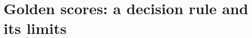 \documentclass[11pt]{article}
\numberwithin{equation}{section}
\theoremstyle{plain}
\theoremstyle{definition}
\theoremstyle{remark}
\begin{document}
%

\section{Golden scores: a decision rule and its limits}\label{gs:sec}
\end{document}
